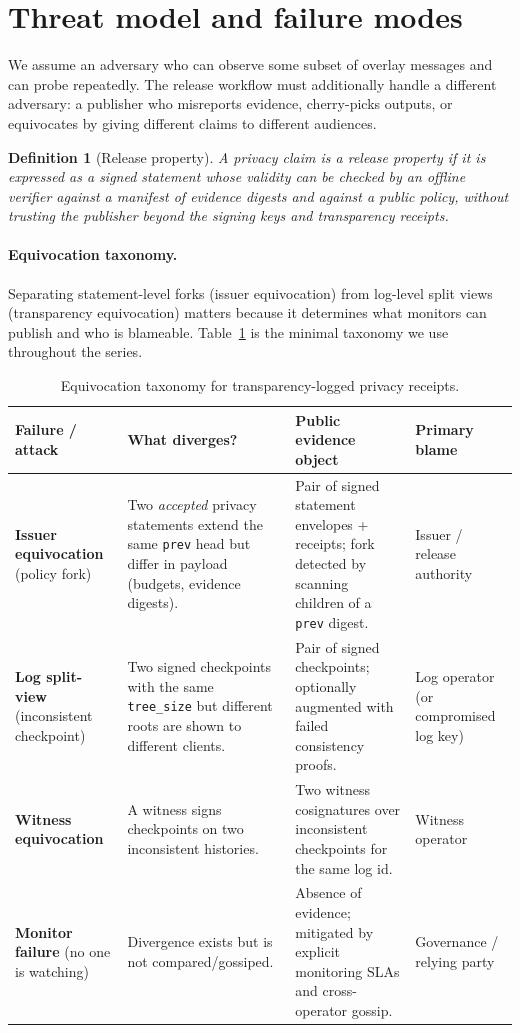 \documentclass[11pt]{article}
\newtheorem{definition}{Definition}
\begin{document}
\section{Threat model and failure modes}
We assume an adversary who can observe some subset of overlay messages and can probe repeatedly.
The release workflow must additionally handle a different adversary: a publisher who misreports evidence, cherry-picks outputs, or equivocates by giving different claims to different audiences.

\begin{definition}[Release property]
A privacy claim is a \emph{release property} if it is expressed as a signed statement whose validity can be checked by an offline verifier against a manifest of evidence digests and against a public policy, without trusting the publisher beyond the signing keys and transparency receipts.
\end{definition}

\paragraph{Equivocation taxonomy.}
Separating statement-level forks (issuer equivocation) from log-level split views (transparency equivocation) matters because it determines what monitors can publish and who is blameable.
Table~\ref{tab:equivocation-taxonomy} is the minimal taxonomy we use throughout the series.

\begin{table}[t]
\centering
\small
\begin{tabular}{@{}p{2.8cm}p{3.3cm}p{4.2cm}p{2.2cm}@{}}
\toprule
\textbf{Failure / attack} & \textbf{What diverges?} & \textbf{Public evidence object} & \textbf{Primary blame} \\
\midrule
\textbf{Issuer equivocation} (policy fork) & Two \emph{accepted} privacy statements extend the same \texttt{prev} head but differ in payload (budgets, evidence digests). & Pair of signed statement envelopes + receipts; fork detected by scanning children of a \texttt{prev} digest. & Issuer / release authority \\
\addlinespace
\textbf{Log split-view} (inconsistent checkpoint) & Two signed checkpoints with the same \texttt{tree\_size} but different roots are shown to different clients. & Pair of signed checkpoints; optionally augmented with failed consistency proofs. & Log operator (or compromised log key) \\
\addlinespace
\textbf{Witness equivocation} & A witness signs checkpoints on two inconsistent histories. & Two witness cosignatures over inconsistent checkpoints for the same log id. & Witness operator \\
\addlinespace
\textbf{Monitor failure} (no one is watching) & Divergence exists but is not compared/gossiped. & Absence of evidence; mitigated by explicit monitoring SLAs and cross-operator gossip. & Governance / relying party \\
\bottomrule
\end{tabular}
\caption{Equivocation taxonomy for transparency-logged privacy receipts.}
\label{tab:equivocation-taxonomy}
\end{table}
\end{document}
